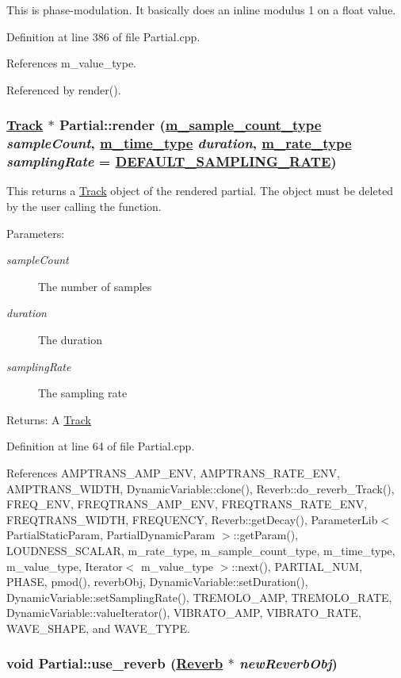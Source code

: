 This is phase-modulation. It basically does an inline modulus 1 on a float value. 

Definition at line 386 of file Partial.cpp.

References m\_\-value\_\-type.

Referenced by render().\hypertarget{classPartial_a1}{
\subsubsection[render]{\setlength{\rightskip}{0pt plus 5cm}\hyperlink{classTrack}{Track} $\ast$ Partial::render (\hyperlink{Types_8h_a1}{m\_\-sample\_\-count\_\-type} {\em sample\-Count}, \hyperlink{Types_8h_a2}{m\_\-time\_\-type} {\em duration}, \hyperlink{Types_8h_a4}{m\_\-rate\_\-type} {\em sampling\-Rate} = \hyperlink{Types_8h_a5}{DEFAULT\_\-SAMPLING\_\-RATE})}}
\label{classPartial_a1}


This returns a \hyperlink{classTrack}{Track} object of the rendered partial. The object must be deleted by the user calling the function. \begin{Desc}
\item[Parameters:]
\begin{description}
\item[{\em sample\-Count}]The number of samples \item[{\em duration}]The duration \item[{\em sampling\-Rate}]The sampling rate \end{description}
\end{Desc}
\begin{Desc}
\item[Returns:]A \hyperlink{classTrack}{Track} \end{Desc}


Definition at line 64 of file Partial.cpp.

References AMPTRANS\_\-AMP\_\-ENV, AMPTRANS\_\-RATE\_\-ENV, AMPTRANS\_\-WIDTH, Dynamic\-Variable::clone(), Reverb::do\_\-reverb\_\-Track(), FREQ\_\-ENV, FREQTRANS\_\-AMP\_\-ENV, FREQTRANS\_\-RATE\_\-ENV, FREQTRANS\_\-WIDTH, FREQUENCY, Reverb::get\-Decay(), Parameter\-Lib$<$ Partial\-Static\-Param, Partial\-Dynamic\-Param $>$::get\-Param(), LOUDNESS\_\-SCALAR, m\_\-rate\_\-type, m\_\-sample\_\-count\_\-type, m\_\-time\_\-type, m\_\-value\_\-type, Iterator$<$ m\_\-value\_\-type $>$::next(), PARTIAL\_\-NUM, PHASE, pmod(), reverb\-Obj, Dynamic\-Variable::set\-Duration(), Dynamic\-Variable::set\-Sampling\-Rate(), TREMOLO\_\-AMP, TREMOLO\_\-RATE, Dynamic\-Variable::value\-Iterator(), VIBRATO\_\-AMP, VIBRATO\_\-RATE, WAVE\_\-SHAPE, and WAVE\_\-TYPE.\hypertarget{classPartial_a2}{
\subsubsection[use\_\-reverb]{\setlength{\rightskip}{0pt plus 5cm}void Partial::use\_\-reverb (\hyperlink{classReverb}{Reverb} $\ast$ {\em new\-Reverb\-Obj})}}
\label{classPartial_a2}


